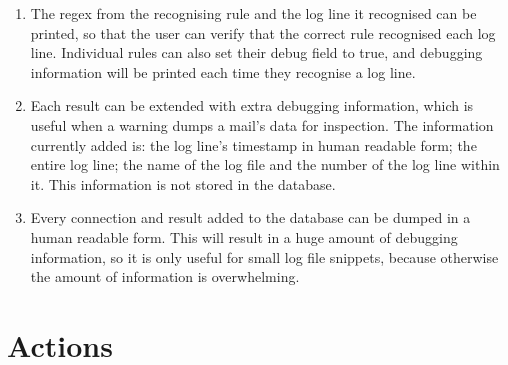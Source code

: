 \begin{enumerate}

    \item The regex from the recognising rule and the log line it
        recognised can be printed, so that the user can verify that the
        correct rule recognised each log line.  Individual rules can also
        set their debug field to true, and debugging information will be
        printed each time they recognise a log line.

    \item Each result can be extended with extra debugging information,
        which is useful when a warning dumps a mail's data for inspection.
        The information currently added is: the log line's timestamp in
        human readable form; the entire log line; the name of the log file
        and the number of the log line within it.  This information is not
        stored in the database.

    \item Every connection and result added to the database can be dumped
        in a human readable form.  This will result in a huge amount of
        debugging information, so it is only useful for small log file
        snippets, because otherwise the amount of information is
        overwhelming.

\end{enumerate}

\section{Actions}

\label{actions in implementation}

